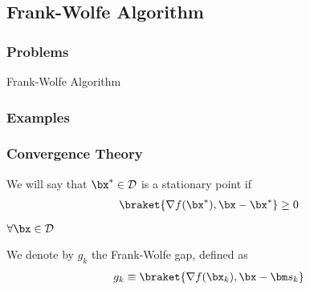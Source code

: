 \subsection{Frank-Wolfe Algorithm}
\subsubsection{Problems}

\begin{algorithm}[H]
    \caption{Frank-Wolfe Algorithm}
    \begin{algorithmic}
        \State %
    \end{algorithmic}
\end{algorithm}


\subsubsection{Examples}


\subsubsection{Convergence Theory}
\begin{definition}
    We will say that $\bx^*\in\mathcal{D}$ is a stationary point if
    \begin{align*}
        \braket{\nabla f(\bx^*), \bx-\bx^*}\ge 0
    \end{align*}
    $\forall\bx\in\mathcal{D}$
\end{definition}

\begin{definition}
    We denote by $g_k$ the Frank-Wolfe gap, defined as
    \begin{align*}
        g_k\equiv \braket{\nabla f(\bx_k), \bx-\bm s_k}
    \end{align*}
\end{definition}

\begin{lemma}
    
\end{lemma}